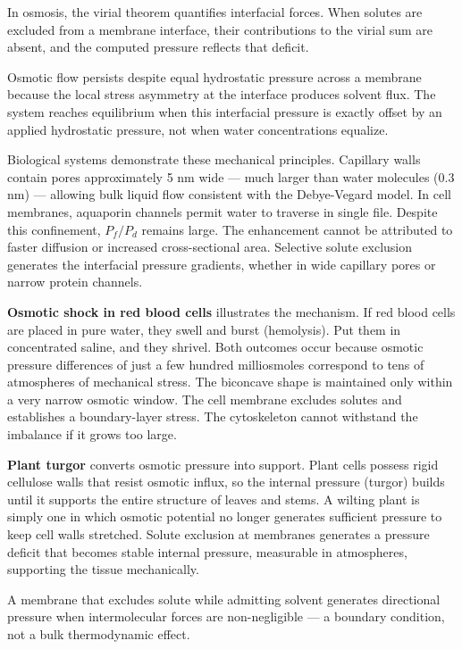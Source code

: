 In osmosis, the virial theorem quantifies interfacial forces. When solutes are excluded from a membrane interface, their contributions to the virial sum are absent, and the computed pressure reflects that deficit.

Osmotic flow persists despite equal hydrostatic pressure across a membrane because the local stress asymmetry at the interface produces solvent flux. The system reaches equilibrium when this interfacial pressure is exactly offset by an applied hydrostatic pressure, not when water concentrations equalize.

Biological systems demonstrate these mechanical principles. Capillary walls contain pores approximately 5 nm wide — much larger than water molecules (0.3 nm) — allowing bulk liquid flow consistent with the Debye-Vegard model. In cell membranes, aquaporin channels permit water to traverse in single file. Despite this confinement, $P_f / P_d$ remains large. The enhancement cannot be attributed to faster diffusion or increased cross-sectional area. Selective solute exclusion generates the interfacial pressure gradients, whether in wide capillary pores or narrow protein channels.

\textbf{Osmotic shock in red blood cells} illustrates the mechanism. If red blood cells are placed in pure water, they swell and burst (hemolysis). Put them in concentrated saline, and they shrivel. Both outcomes occur because osmotic pressure differences of just a few hundred milliosmoles correspond to tens of atmospheres of mechanical stress. The biconcave shape is maintained only within a very narrow osmotic window. The cell membrane excludes solutes and establishes a boundary-layer stress. The cytoskeleton cannot withstand the imbalance if it grows too large.

\textbf{Plant turgor} converts osmotic pressure into support. Plant cells possess rigid cellulose walls that resist osmotic influx, so the internal pressure (turgor) builds until it supports the entire structure of leaves and stems. A wilting plant is simply one in which osmotic potential no longer generates sufficient pressure to keep cell walls stretched. Solute exclusion at membranes generates a pressure deficit that becomes stable internal pressure, measurable in atmospheres, supporting the tissue mechanically.

A membrane that excludes solute while admitting solvent generates directional pressure when intermolecular forces are non-negligible — a boundary condition, not a bulk thermodynamic effect.

